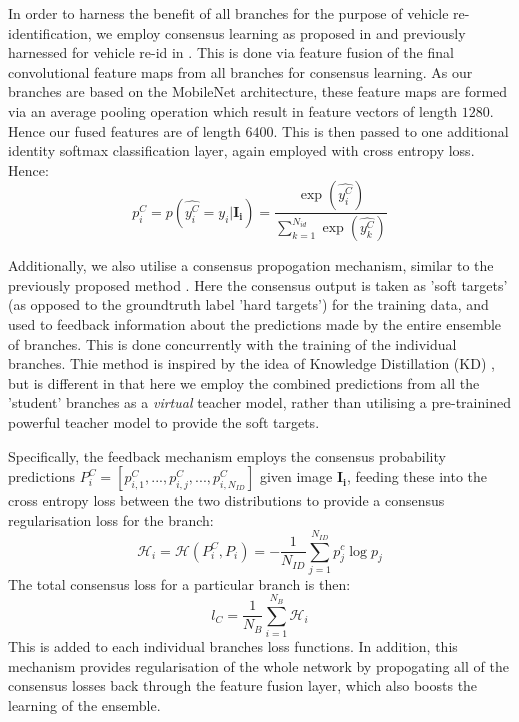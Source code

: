 \documentclass[10pt,twocolumn,letterpaper]{article}
\begin{document}
In order to harness the benefit of all branches for the purpose of vehicle re-identification, we employ consensus learning as proposed in \cite{chen2017person} and previously harnessed for vehicle re-id in \cite{kanaci2018vehicle}. This is done via feature fusion of the final convolutional feature maps from all branches for consensus learning. As our branches are based on the MobileNet architecture, these feature maps are formed via an average pooling operation which result in feature vectors of length $1280$. Hence our fused features are of length $6400$. This is then passed to one additional identity softmax classification layer, again employed with cross entropy loss. Hence:
\begin{equation}
  p_i^C = p(\hat{y_i^C} = y_i|\mathbf{I_i}) = \frac{\exp(\hat{y_i^C})}{\sum_{k=1}^{N_{id}}\exp(\hat{y_k^C})}
\end{equation}

Additionally, we also utilise a consensus propogation mechanism, similar to the previously proposed method \cite{chen2017person,kanaci2018vehicle}. Here the consensus output is taken as 'soft targets' (as opposed to the groundtruth label 'hard targets') for the training data, and used to feedback information about the predictions made by the entire ensemble of branches. This is done concurrently with the training of the individual branches. Thie method is inspired by the idea of Knowledge Distillation (KD) \cite{hinton2015distilling}, but is different in that here we employ the combined predictions from all the 'student' branches as a \emph{virtual} teacher model, rather than utilising a pre-trainined powerful teacher model to provide the soft targets.

Specifically, the feedback mechanism employs the consensus probability predictions $P^C_i = \left[p_{i,1}^C,...,p_{i,j}^C,...,p_{i,N_{ID}}^C\right]$ given image $\mathbf{I_i}$, feeding these into the cross entropy loss between the two distributions to provide a consensus regularisation loss for the branch:
\begin{equation}
  \mathcal{H}_i = \mathcal{H}(P^C_i, P_i) = -\frac{1}{N_{ID}}\sum_{j=1}^{N_{ID}} p_j^c \log{p_j}
\end{equation}
The total consensus loss for a particular branch is then:
\begin{equation}
  l_{C} = \frac{1}{N_B} \sum_{i=1}^{N_B} \mathcal{H}_i
\end{equation}
This is added to each individual branches loss functions. In addition, this mechanism provides regularisation of the whole network by propogating all of the consensus losses back through the feature fusion layer, which also boosts the learning of the ensemble.
\end{document}
